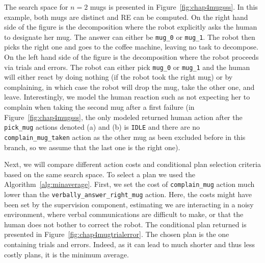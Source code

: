 \documentclass[a4paper,11pt,twoside]{StyleThese}
\begin{document}
The search space for $n=2$ mugs is presented in Figure~\ref{fig:chap4mugsss}. In this example, both mugs are distinct and RE can be computed. On the right hand side of the figure is the decomposition where the robot explicitly asks the human to designate her mug. The answer can either be \verb'mug_0' or \verb'mug_1'. The robot then picks the right one and goes to the coffee machine, leaving no task to decompose.
On the left hand side of the figure is the decomposition where the robot proceeds via trials and errors. The robot can either pick \verb'mug_0' or \verb'mug_1' and the human will either react by doing nothing (if the robot took the right mug) or by complaining, in which case the robot will drop the mug, take the other one, and leave. Interestingly, we model the human reaction such as not expecting her to complain when taking the second mug after a first failure (in Figure~\ref{fig:chap4mugsss}, the only modeled returned human action after the \verb'pick_mug' actions denoted (a) and (b) is \verb'IDLE' and there are no \verb'complain_mug_taken' action as the other mug as been excluded before in this branch, so we assume that the last one is the right one).

Next, we will compare different action costs and conditional plan selection criteria based on the same search space. To select a plan we used the Algorithm~\ref{alg:minaverage}. First, we set the cost of \verb'complain_mug' action much lower than the \verb'verbally_answer_right_mug' action. Here, the costs might have been set by the supervision component, estimating we are interacting in a noisy environment, where verbal communications are difficult to make, or that the human does not bother to correct the robot. The conditional plan returned is presented in Figure~\ref{fig:chap4mugtrialerror}. The chosen plan is the one containing trials and errors. Indeed, as it can lead to much shorter and thus less costly plans, it is the minimum average. 
\end{document}
